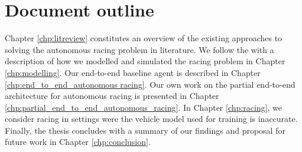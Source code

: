 

\section{Document outline}
\label{sec:outline}

Chapter \ref{chp:litreview} constitutes an overview of the existing approaches to solving the autonomous racing problem in literature. 
We follow the with a description of how we modelled and simulated the racing problem in Chapter \ref{chp:modelling}.
Our end-to-end baseline agent is described in Chapter \ref{chp:end_to_end_autonomous racing}.
Our own work on the  partial end-to-end architecture for autonomous racing is presented in Chapter \ref{chp:partial_end_to_end_autonomous_racing}.
In Chapter \ref{chp:racing}, we consider racing in settings were the vehicle model used for training is inaccurate.
Finally, the thesis concludes with a summary of our findings and proposal for future work in Chapter \ref{chp:conclusion}.

